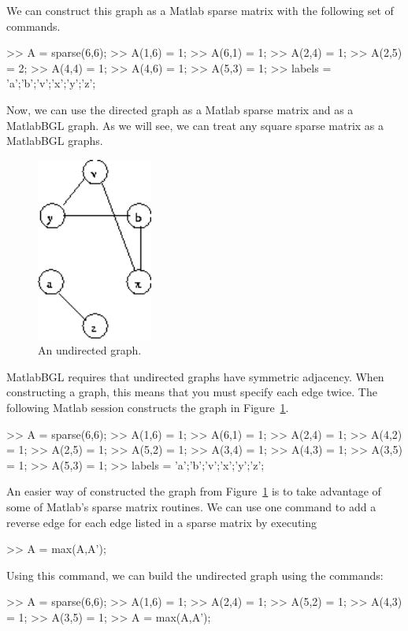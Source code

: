 \documentclass[12pt]{article}
\begin{document}
We can construct this graph as a Matlab sparse matrix with the following set of commands.

\begin{mcode}
>> A = sparse(6,6);
>> A(1,6) = 1;
>> A(6,1) = 1;
>> A(2,4) = 1;
>> A(2,5) = 2;
>> A(4,4) = 1;
>> A(4,6) = 1;
>> A(5,3) = 1;
>> labels = {'a';'b';'v';'x';'y';'z'};
\end{mcode}

Now, we can use the directed graph as a Matlab sparse matrix and as a MatlabBGL graph.  As we will see, we can treat any square sparse matrix as a MatlabBGL graphs.

\begin{figure}[ht!]
\centering
\includegraphics[width=1.5in]{undigraph}
\caption{An undirected graph.}
\label{fig:undigraph}
\end{figure}

MatlabBGL requires that undirected graphs have symmetric adjacency.  When constructing a graph, this means that you must specify each edge twice.  The following Matlab session constructs the graph in Figure~\ref{fig:undigraph}.

\begin{mcode}
>> A = sparse(6,6);
>> A(1,6) = 1;
>> A(6,1) = 1;
>> A(2,4) = 1;
>> A(4,2) = 1;
>> A(2,5) = 1;
>> A(5,2) = 1;
>> A(3,4) = 1;
>> A(4,3) = 1;
>> A(3,5) = 1;
>> A(5,3) = 1;
>> labels = {'a';'b';'v';'x';'y';'z'};
\end{mcode}

An easier way of constructed the graph from Figure~\ref{fig:undigraph} is to take advantage of some of Matlab's sparse matrix routines.  We can use one command to add a reverse edge for each edge listed in a sparse matrix by executing
\begin{mcode}
>> A = max(A,A');
\end{mcode}

Using this command, we can build the undirected graph using the commands:
\begin{mcode}
>> A = sparse(6,6);
>> A(1,6) = 1;
>> A(2,4) = 1;
>> A(5,2) = 1;
>> A(4,3) = 1;
>> A(3,5) = 1;
>> A = max(A,A');
\end{mcode}
\end{document}
